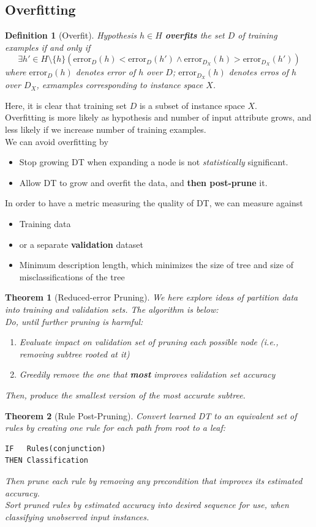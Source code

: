 \documentclass[12pt]{article}
\newtheorem{definition}{Definition}[section]
\newtheorem{theorem}{Theorem}[section]
\theoremstyle{definition}
\begin{document}
\subsection{Overfitting}
\begin{definition}[Overfit]
\normalfont Hypothesis $h\in H$ \textbf{overfits} the set $D$ of training examples if and only if
\[
\exists h'\in H\setminus\{h\} (\mathrm{error}_D(h)<\mathrm{error}_D(h') \land \mathrm{error}_{D_X}(h)>\mathrm{error}_{D_X}(h'))
\]
where $\mathrm{error}_D(h)$ denotes error of $h$ over $D$; $\mathrm{error}_{D_X}(h)$ denotes erros of $h$ over $D_X$, exmamples corresponding to instance space $X$.
\end{definition}
Here, it is clear that training set $D$ is a subset of instance space $X$.\\
Overfitting is more likely as hypothesis and number of input attribute grows, and less likely if we increase number of training examples.\\
We can avoid overfitting by
\begin{itemize}
	\item Stop growing DT when expanding a node is not \textit{statistically} significant.
	\item Allow DT to grow and overfit the data, and \textbf{then post-prune} it.
\end{itemize}
In order to have a metric measuring the quality of DT, we can measure against
\begin{itemize}
	\item Training data
	\item or a separate \textbf{validation} dataset
	\item Minimum description length, which minimizes the size of tree and size of misclassifications of the tree
\end{itemize}
\begin{theorem}[Reduced-error Pruning]
\normalfont
We here explore ideas of partition data into \textit{training} and \textit{validation} sets. The algorithm is below:\\
Do, until further pruning is harmful:
\begin{enumerate}
	\item Evaluate impact on \textit{validation} set of pruning each possible node (i.e., removing subtree rooted at it)
	\item Greedily remove the one that \textbf{most} improves validation set accuracy
\end{enumerate}
Then, produce the smallest version of the most accurate subtree.
\end{theorem}
\begin{theorem}[Rule Post-Pruning]
\normalfont Convert learned DT to an equivalent set of rules by creating one rule for each path from root to a leaf:
\begin{verbatim}
IF   Rules(conjunction)
THEN Classification
\end{verbatim}
Then prune each rule by removing any precondition that improves its estimated accuracy.\\
Sort pruned rules by estimated accuracy into desired sequence for use, when classifying unobserved input instances.
\end{theorem}
\end{document}
